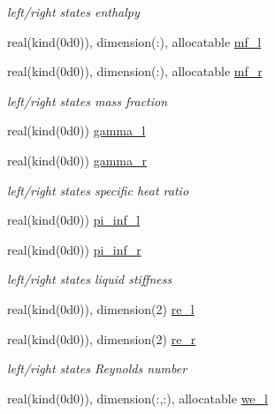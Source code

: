 \begin{Indent}
\begin{DoxyCompactItemize}
\begin{DoxyCompactList}\small\item\em left/right states enthalpy \end{DoxyCompactList}\item 
real(kind(0d0)), dimension(\+:), allocatable \hyperlink{namespacem__variables__conversion_a0f5485ff839ecbf46ff48d6dc74c0d90}{mf\+\_\+l}
\item 
real(kind(0d0)), dimension(\+:), allocatable \hyperlink{namespacem__variables__conversion_ae846c6fc6552d5bfe98e1e6ad69d1097}{mf\+\_\+r}
\begin{DoxyCompactList}\small\item\em left/right states mass fraction \end{DoxyCompactList}\item 
real(kind(0d0)) \hyperlink{namespacem__variables__conversion_a40a27c491716f10b38a268a8e93c5a5f}{gamma\+\_\+l}
\item 
real(kind(0d0)) \hyperlink{namespacem__variables__conversion_a08058afcc5db00000abcceb8e3968eee}{gamma\+\_\+r}
\begin{DoxyCompactList}\small\item\em left/right states specific heat ratio \end{DoxyCompactList}\item 
real(kind(0d0)) \hyperlink{namespacem__variables__conversion_a6f2d4a77c301f98562a27a23b2983691}{pi\+\_\+inf\+\_\+l}
\item 
real(kind(0d0)) \hyperlink{namespacem__variables__conversion_ab9f7728bd98c31174efdeaf389d724c5}{pi\+\_\+inf\+\_\+r}
\begin{DoxyCompactList}\small\item\em left/right states liquid stiffness \end{DoxyCompactList}\item 
real(kind(0d0)), dimension(2) \hyperlink{namespacem__variables__conversion_a3b45952794b8a8edb8ec8bc3612edbe3}{re\+\_\+l}
\item 
real(kind(0d0)), dimension(2) \hyperlink{namespacem__variables__conversion_aea8ad83f5633509287326ea1a428cb89}{re\+\_\+r}
\begin{DoxyCompactList}\small\item\em left/right states Reynolds number \end{DoxyCompactList}\item 
real(kind(0d0)), dimension(\+:,\+:), allocatable \hyperlink{namespacem__variables__conversion_a87022a7b6fc9b57912e4fca2d38bd0e2}{we\+\_\+l}
\item 

\end{DoxyCompactItemize}
\end{Indent}
